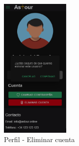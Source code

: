 \begin{enumerate}
\begin{figure}[H]
		      \includegraphics[width=0.3\textwidth]{7-Construccion/Manuales/mobile/confirmar eliminacion cuenta.png}
		      \caption{Perfil - Eliminar cuenta}
	      \end{figure}
\end{enumerate}

